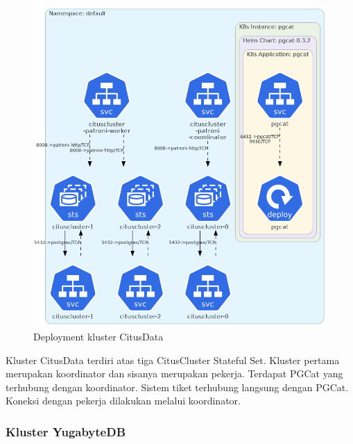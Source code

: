 \begin{figure}[htbp]
    \centering
    \includegraphics[width=1\textwidth]{resources/chapter-4/citusdata.png}
    \caption{Deployment kluster CitusData}
    \label{fig:deployment-citusdata}
\end{figure}

Kluster CitusData terdiri atas tiga CitusCluster Stateful Set. Kluster pertama merupakan koordinator dan sisanya merupakan pekerja. Terdapat PGCat yang terhubung dengan koordinator. Sistem tiket terhubung langsung dengan PGCat. Koneksi dengan pekerja dilakukan melalui koordinator.

\pagebreak

\subsubsection{Kluster YugabyteDB}


